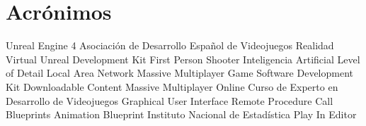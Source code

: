 \section*{Acrónimos}

{\small
\begin{acronym}[XXXXXXXX]
  	 {Unreal Engine 4}
  	 {Asociación de Desarrollo Español de Videojuegos}
  		 {Realidad Virtual}
   	 {Unreal Development Kit}
  	 {First Person Shooter}
  		 {Inteligencia Artificial}
  	 {Level of Detail}
  	 {Local Area Network}
  	 {Massive Multiplayer Game}
       {Software Development Kit}
  	 {Downloadable Content}
  	 {Massive Multiplayer Online}
  	 {Curso de Experto en Desarrollo de Videojuegos}
  	 {Graphical User Interface}
  	 {Remote Procedure Call}
  		 {Blueprints}
  	 {Animation Blueprint}
  	 {Instituto Nacional de Estadística}
  	 {Play In Editor}
\end{acronym}
}
